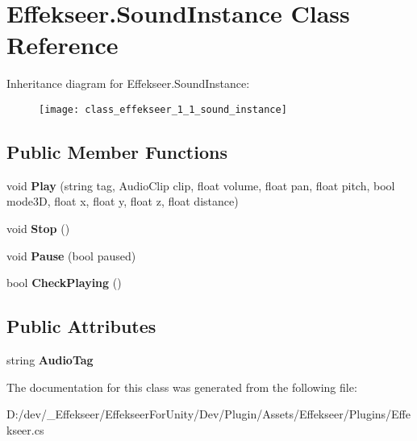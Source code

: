 \hypertarget{class_effekseer_1_1_sound_instance}{\section{Effekseer.\-Sound\-Instance Class Reference}
\label{class_effekseer_1_1_sound_instance}
}
Inheritance diagram for Effekseer.\-Sound\-Instance\-:\begin{figure}[H]
\begin{center}
\leavevmode
\texttt{[image: class\_effekseer\_1\_1\_sound\_instance]}
\end{center}
\end{figure}
\subsection*{Public Member Functions}
\begin{DoxyCompactItemize}
\item 
\hypertarget{class_effekseer_1_1_sound_instance_a0dad13c99eec9f7fd3a254da889d41b0}{void {\bfseries Play} (string tag, Audio\-Clip clip, float volume, float pan, float pitch, bool mode3\-D, float x, float y, float z, float distance)}\label{class_effekseer_1_1_sound_instance_a0dad13c99eec9f7fd3a254da889d41b0}

\item 
\hypertarget{class_effekseer_1_1_sound_instance_a47120b96077ba0222ba7dcaac289947f}{void {\bfseries Stop} ()}\label{class_effekseer_1_1_sound_instance_a47120b96077ba0222ba7dcaac289947f}

\item 
\hypertarget{class_effekseer_1_1_sound_instance_a8bea651d2b06d9f9cf4cefc97a9f7226}{void {\bfseries Pause} (bool paused)}\label{class_effekseer_1_1_sound_instance_a8bea651d2b06d9f9cf4cefc97a9f7226}

\item 
\hypertarget{class_effekseer_1_1_sound_instance_aba66c6f052a23feff462c6ceebd09b2e}{bool {\bfseries Check\-Playing} ()}\label{class_effekseer_1_1_sound_instance_aba66c6f052a23feff462c6ceebd09b2e}

\end{DoxyCompactItemize}
\subsection*{Public Attributes}
\begin{DoxyCompactItemize}
\item 
\hypertarget{class_effekseer_1_1_sound_instance_aaecb9b470d568fa58a7b89d9b8374e65}{string {\bfseries Audio\-Tag}}\label{class_effekseer_1_1_sound_instance_aaecb9b470d568fa58a7b89d9b8374e65}

\end{DoxyCompactItemize}


The documentation for this class was generated from the following file\-:\begin{DoxyCompactItemize}
\item 
D\-:/dev/\-\_\-\-Effekseer/\-Effekseer\-For\-Unity/\-Dev/\-Plugin/\-Assets/\-Effekseer/\-Plugins/Effekseer.\-cs\end{DoxyCompactItemize}
